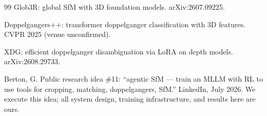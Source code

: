 \documentclass[10pt,twocolumn,letterpaper]{article}
\begin{document}
\begin{thebibliography}{99}
 Glob3R: global SfM with 3D foundation models.
arXiv:2607.09225.

 Doppelgangers++: transformer doppelganger
classification with 3D features. CVPR 2025 (venue unconfirmed).

 XDG: efficient doppelganger disambiguation via LoRA on
depth models. arXiv:2608.29733.

 Berton, G. Public research idea \#11: ``agentic
SfM — train an MLLM with RL to use tools for cropping, matching,
doppelgangers, SfM.'' LinkedIn, July 2026. We execute this idea; all
system design, training infrastructure, and results here are ours.

\end{thebibliography}
\end{document}
